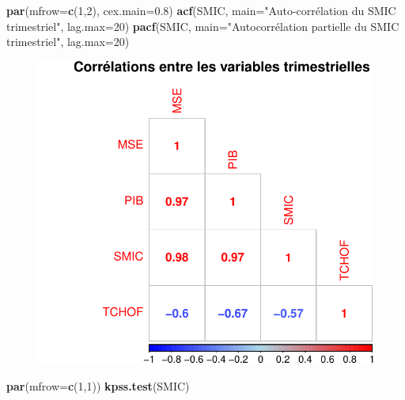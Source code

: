 \documentclass[11pt,]{article}
\newenvironment{Shaded}{\begin{snugshade}}{\end{snugshade}}
\newcommand{\KeywordTok}[1]{\textcolor[rgb]{0.13,0.29,0.53}{\textbf{#1}}}
\newcommand{\DataTypeTok}[1]{\textcolor[rgb]{0.13,0.29,0.53}{#1}}
\newcommand{\DecValTok}[1]{\textcolor[rgb]{0.00,0.00,0.81}{#1}}
\newcommand{\FloatTok}[1]{\textcolor[rgb]{0.00,0.00,0.81}{#1}}
\newcommand{\StringTok}[1]{\textcolor[rgb]{0.31,0.60,0.02}{#1}}
\newcommand{\NormalTok}[1]{#1}
\begin{document}
\begin{Shaded}
\begin{Highlighting}[]
  \KeywordTok{par}\NormalTok{(}\DataTypeTok{mfrow=}\KeywordTok{c}\NormalTok{(}\DecValTok{1}\NormalTok{,}\DecValTok{2}\NormalTok{), }\DataTypeTok{cex.main=}\FloatTok{0.8}\NormalTok{)}
  \KeywordTok{acf}\NormalTok{(SMIC, }\DataTypeTok{main=}\StringTok{"Auto-corrélation du}
\StringTok{      SMIC trimestriel"}\NormalTok{, }\DataTypeTok{lag.max=}\DecValTok{20}\NormalTok{)}
  \KeywordTok{pacf}\NormalTok{(SMIC, }\DataTypeTok{main=}\StringTok{"Autocorrélation partielle}
\StringTok{       du SMIC trimestriel"}\NormalTok{, }\DataTypeTok{lag.max=}\DecValTok{20}\NormalTok{)}
\end{Highlighting}
\end{Shaded}

\begin{figure}
\centering
\includegraphics{doc_files/figure-latex/unnamed-chunk-6-1.pdf}
\caption{\label{fig6}}
\end{figure}

\begin{Shaded}
\begin{Highlighting}[]
  \KeywordTok{par}\NormalTok{(}\DataTypeTok{mfrow=}\KeywordTok{c}\NormalTok{(}\DecValTok{1}\NormalTok{,}\DecValTok{1}\NormalTok{))}
  \KeywordTok{kpss.test}\NormalTok{(SMIC)}
\end{Highlighting}
\end{Shaded}
\end{document}
